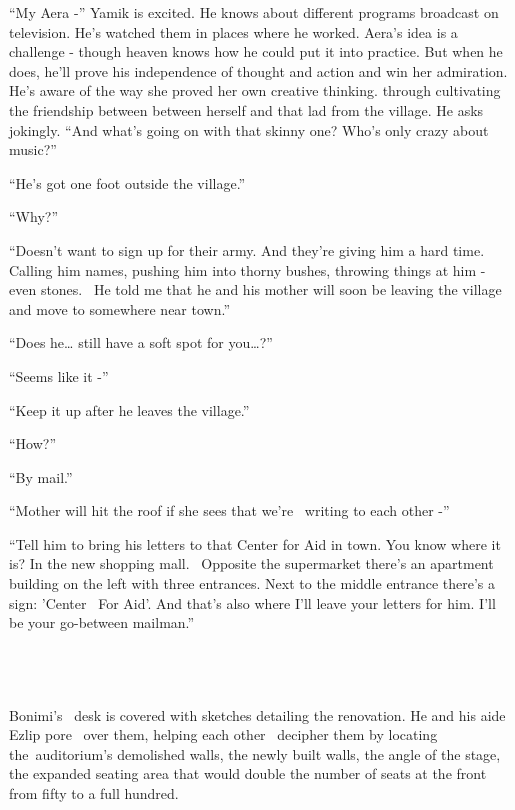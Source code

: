 \documentclass[twoside,11pt]{book}
\begin{document}
``My Aera -'' Yamik is excited. He knows about different programs broadcast on television.
He's watched them in places where he worked. Aera's idea is a challenge -\newline
 though heaven knows how he could put it into practice. But when he does, he'll prove his independence of thought and
action and win her admiration. He's aware of the way she proved her own creative thinking{. }through
cultivating the friendship between between herself and that lad from the village. He asks jokingly. ``And
what's going on with that skinny one? Who's only crazy about music?''

``He's got one foot outside the village.''

``Why?''

``Doesn't want to sign up for their army. And they're giving him a hard time. Calling him names, pushing
him into thorny bushes, throwing things at him - even stones. ~He told me that he and his mother will soon be leaving
the village and move to somewhere near town.''

``Does he{\dots} still have a soft spot for you{\dots}?''

``Seems like it -''

``Keep it up after he leaves the village.''

``How?''

``By mail.''

``Mother will hit the roof if she sees that we're \ writing to each other -''

``Tell him to bring his letters to that Center for Aid in town. You know where it is? In the new shopping
mall. \ Opposite the supermarket there's an apartment building on the left with three entrances. Next to the middle
entrance there's a sign: 'Center \ For Aid'. And that's also where I'll leave your letters for him. I'll be your
go-between mailman.''

~

\chapter{}

Bonimi's ~desk is covered{ }with sketches detailing the renovation. He and his aide Ezlip pore \ over
them, helping each other ~decipher them by locating the~auditorium's demolished walls, the newly built walls, the angle
of the stage, the expanded seating area that would double the number of seats at the front from fifty to a
full{ }hundred.~
\end{document}

